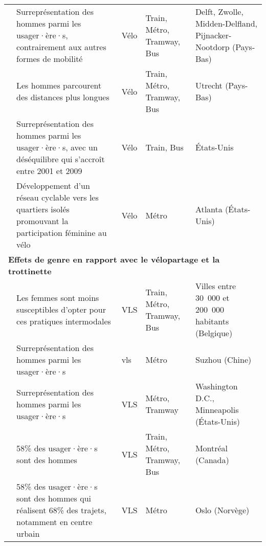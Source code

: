 \begin{longtable}{p{3cm}p{4cm}p{1.5cm}p{1.8cm}p{2.3cm}}
    \small{\textcite{heinen_multimodal_2014}}\index{Heinen, Eva|pagebf} & \small{Surreprésentation des hommes parmi les usager·ère·s, contrairement aux autres formes de mobilité} & \small{Vélo} & \small{Train, Métro, Tramway, Bus} & \small{Delft, Zwolle, Midden-Delfland, Pijnacker-Nootdorp (Pays-Bas)}\\
    \small{\textcite{krygsman_multimodal_2004}}\index{Krygsman, Stephan|pagebf} & \small{Les hommes parcourent des distances plus longues} & \small{Vélo} & \small{Train, Métro, Tramway, Bus} & \small{Utrecht (Pays-Bas)}\\
    \small{\textcite{wang_bicycle-transit_2013}}\index{Wang, Rui|pagebf} & \small{Surreprésentation des hommes parmi les usager·ère·s, avec un déséquilibre qui s'accroît entre 2001 et 2009} & \small{Vélo} & \small{Train, Bus} & \small{États-Unis}\\
    \small{\textcite{bearn_adaption_2018}}\index{Bearn, Cary|pagebf} & \small{Développement d'un réseau cyclable vers les quartiers isolés promouvant la participation féminine au vélo} & \small{Vélo} & \small{Métro} & \small{Atlanta (États-Unis)}\\
    \hline
\multicolumn{5}{l}{\textbf{Effets de genre en rapport avec le vélopartage et la trottinette}}\\
    \small{\textcite{adnan_last-mile_2019}}\index{Adnan, Muhammad|pagebf} & \small{Les femmes sont moins susceptibles d'opter pour ces pratiques intermodales} & \small{VLS} & \small{Train, Métro, Tramway, Bus} & \small{Villes entre 30~000 et 200~000 habitants (Belgique)}\\
    \small{\textcite{ma_measuring_2018}}\index{Ma, Xinwei|pagebf} & \small{Surreprésentation des hommes parmi les usager·ère·s} & \small{vls} & \small{Métro} & \small{Suzhou (Chine)}\\
    \small{\textcite{martin_evaluating_2014}}\index{Martin, Elliot W.|pagebf} & \small{Surreprésentation des hommes parmi les usager·ère·s} & \small{VLS} & \small{Métro, Tramway} & \small{Washington D.C., Minneapolis (États-Unis)}\\
    \small{\textcite{bachand-marleau_much-anticipated_2011}}\index{Bachand-Marleau, Julie|pagebf} & \small{58\% des usager·ère·s sont des hommes} & \small{VLS} & \small{Train, Métro, Tramway, Bus} & \small{Montréal (Canada)}\\
    \small{\textcite{bocker_bike_2020}}\index{Böcker, Lars|pagebf} & \small{58\% des usager·ère·s sont des hommes qui réalisent 68\% des trajets, notamment en centre urbain} & \small{VLS} & \small{Métro} & \small{Oslo (Norvège)}\\

\end{longtable}
